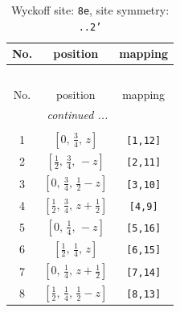 \documentclass[fleqn,8pt]{jsarticle}
\begin{document}
\begin{longtable}{ccc}
\caption{Wyckoff site: {\tt 8e}, site symmetry: {\tt ..2'}}
 \\
 \hline \hline
No. & position & mapping \\ \hline \endfirsthead

\multicolumn{2}{l}{\tablename\ \thetable{}} \\
 \hline \hline
No. & position & mapping \\ \hline \endhead

 \hline \hline
\multicolumn{2}{r}{\footnotesize\it continued ...} \\ \endfoot

 \hline \hline
\multicolumn{2}{r}{} \\ \endlastfoot

1 & $\left[ 0,\, \frac{3}{4},\, z \right]$ & {\tt [1,12]} \\ \hline
2 & $\left[ \frac{1}{2},\, \frac{3}{4},\, - z \right]$ & {\tt [2,11]} \\ \hline
3 & $\left[ 0,\, \frac{3}{4},\, \frac{1}{2} - z \right]$ & {\tt [3,10]} \\ \hline
4 & $\left[ \frac{1}{2},\, \frac{3}{4},\, z + \frac{1}{2} \right]$ & {\tt [4,9]} \\ \hline
5 & $\left[ 0,\, \frac{1}{4},\, - z \right]$ & {\tt [5,16]} \\ \hline
6 & $\left[ \frac{1}{2},\, \frac{1}{4},\, z \right]$ & {\tt [6,15]} \\ \hline
7 & $\left[ 0,\, \frac{1}{4},\, z + \frac{1}{2} \right]$ & {\tt [7,14]} \\ \hline
8 & $\left[ \frac{1}{2},\, \frac{1}{4},\, \frac{1}{2} - z \right]$ & {\tt [8,13]} \\
\end{longtable}
\renewcommand{\arraystretch}{1.2}
\end{document}
